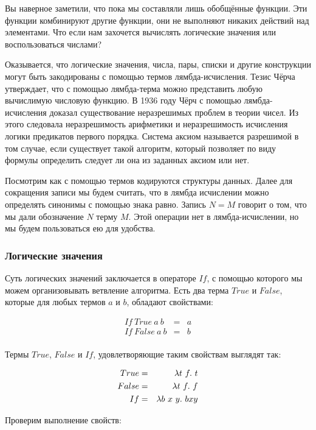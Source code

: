 Вы наверное заметили, что пока мы составляли лишь 
обобщённые функции. Эти функции комбинируют другие функции,
они не выполняют никаких действий над элементами.
Что если нам захочется вычислять логические
значения или воспользоваться числами? 

Оказывается, что логические значения, числа, пары, списки
и  другие конструкции могут быть закодированы с помощью
термов лямбда-исчисления. Тезис Чёрча утверждает, что
с помощью лямбда-терма можно представить любую вычислимую 
числовую функцию. В 1936 году Чёрч с помощью лямбда-исчисления
доказал существование неразрешимых проблем в теории чисел. 
Из этого следовала неразрешимость арифметики и неразрешимость
исчисления логики предикатов первого порядка. Система аксиом
называется разрешимой в том случае, если существует такой алгоритм,
который позволяет по виду формулы определить следует ли она
из заданных аксиом или нет.

Посмотрим как с помощью термов кодируются структуры данных.
Далее для сокращения записи мы будем считать, что в лямбда 
исчислении можно определять синонимы с помощью знака равно.
Запись $N = M$ говорит о том, что мы дали обозначение $N$
терму $M$. Этой операции нет в лямбда-исчислении, но мы будем
пользоваться ею для удобства.

\subsubsection{Логические значения}

Суть логических значений заключается в операторе $If$,
с помощью которого мы можем организовывать ветвление
алгоритма. Есть два терма $True$ и $False$, которые
для любых термов $a$ и $b$, обладают свойствами:

\begin{eqnarray*}
If\ True\ a\ b &=& a \\
If\ False\ a\ b &=& b \\
\end{eqnarray*}

Термы $True$, $False$ и $If$, удовлетворяющие таким свойствам выглядят так:

\begin{eqnarray*}
True  &=& \lambda t\ f .\  t \\
False &=& \lambda t\ f .\  f \\
If    &=& \lambda b\ x\ y .\  b x y \\
\end{eqnarray*}

Проверим выполнение свойств:

